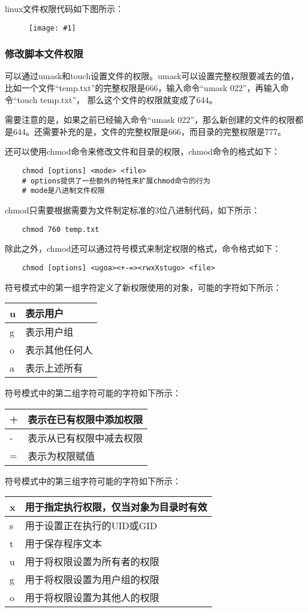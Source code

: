 \documentclass[a4paper,left=2.5cm,right=2.5cm,11pt]{article}
\newcommand{\fic}[1]{\begin{figure}[H]
		\center
		\texttt{[image: \#1]}
	\end{figure}}
\begin{document}
	linux文件权限代码如下图所示：
	\fic{2.png}

\subsubsection{修改脚本文件权限}
	可以通过umask和touch设置文件的权限。umask可以设置完整权限要减去的值，比如一个文件“temp.txt”的完整权限是666，输入命令“umask 022”，再输入命令“touch temp.txt”，
	那么这个文件的权限就变成了644。\par
	需要注意的是，如果之前已经输入命令“umask 022”，那么新创建的文件的权限都是644。还需要补充的是，文件的完整权限是666，而目录的完整权限是777。\par

	还可以使用chmod命令来修改文件和目录的权限，chmod命令的格式如下：
	\begin{lstlisting}
	chmod [options] <mode> <file>
	# options提供了一些额外的特性来扩展chmod命令的行为
	# mode是八进制文件权限
	\end{lstlisting}

	chmod只需要根据需要为文件制定标准的3位八进制代码，如下所示：
	\begin{lstlisting}
	chmod 760 temp.txt
	\end{lstlisting}

	除此之外，chmod还可以通过符号模式来制定权限的格式，命令格式如下：
	\begin{lstlisting}
	chmod [options] <ugoa><+-=><rwxXstugo> <file>
	\end{lstlisting}

	符号模式中的第一组字符定义了新权限使用的对象，可能的字符如下所示：
	\begin{longtable}{p{1.5cm}p{3cm}}
	\hline
	u & 表示用户 \\
	\hline
	g & 表示用户组 \\
	\hline
	o & 表示其他任何人 \\
	\hline
	a & 表示上述所有 \\
	\hline
	\end{longtable}

	符号模式中的第二组字符可能的字符如下所示：
	\begin{longtable}{p{1.5cm}p{6cm}}
	\hline
	+ & 表示在已有权限中添加权限 \\
	\hline
	- & 表示从已有权限中减去权限 \\
	\hline
	= & 表示为权限赋值 \\
	\hline
	\end{longtable}

	符号模式中的第三组字符可能的字符如下所示：
	\begin{longtable}{p{1.5cm}p{6cm}}
	\hline
	x & 用于指定执行权限，仅当对象为目录时有效 \\
	\hline
	s & 用于设置正在执行的UID或GID \\
	\hline
	t & 用于保存程序文本 \\
	\hline
	u & 用于将权限设置为所有者的权限 \\
	\hline
	g & 用于将权限设置为用户组的权限 \\
	\hline
	o & 用于将权限设置为其他人的权限 \\
	\hline
	\end{longtable}
\end{document}
